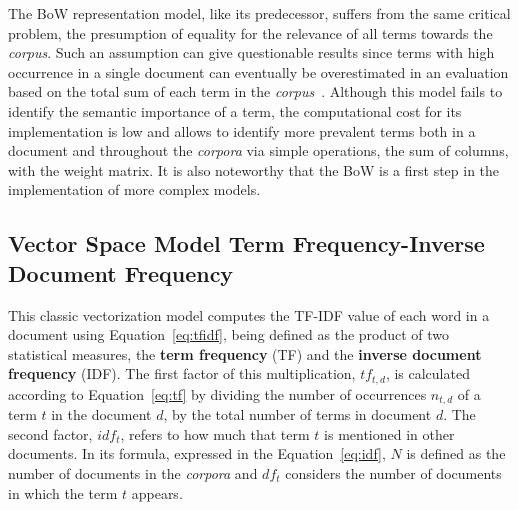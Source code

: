 \documentclass{ieeeaccess}
\begin{document}
The BoW representation model, like its predecessor, suffers from the same critical problem, the presumption of equality for the relevance of all terms towards the \textit{corpus}. Such an assumption can give questionable results since terms with high occurrence in a single document can eventually be overestimated in an evaluation based on the total sum of each term in the \textit{corpus}~\cite{manning2010introduction}. Although this model fails to identify the semantic importance of a term, the computational cost for its implementation is low and allows to identify more prevalent terms both in a document and throughout the \textit{corpora} via simple operations, the sum of columns, with the weight matrix. It is also noteworthy that the BoW is a first step in the implementation of more complex models.


\subsection{Vector Space Model Term Frequency-Inverse Document Frequency}



This classic vectorization model computes the TF-IDF value of each word in a document using Equation~\ref{eq:tfidf}, being defined as the product of two statistical measures, the \textbf{term frequency} (TF) and the  \textbf{inverse document frequency} (IDF). The first factor of this multiplication, $ tf_{t,d}$, is calculated according to Equation~\ref{eq:tf} by dividing the number of occurrences $ n_{t,d} $ of a term $ t $ in the document $ d $, by the total number of terms in document  $ d $. The second factor, $ idf_{t} $, refers to how much that term $ t $ is mentioned in other documents. In its formula, expressed in the Equation~\ref{eq:idf}, $ N $ is defined as the number of documents in the \textit {corpora} and $ df_{t} $ considers the number of documents in which the term $ t $ appears.
\end{document}

